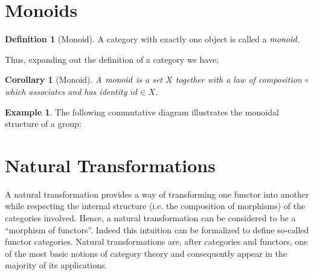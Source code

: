 \documentclass[10pt, oneside, reqno]{amsart}
\theoremstyle{plain}%
\newtheorem*{cor}{Corollary}
\theoremstyle{definition}
\newtheorem{defn}[thm]{Definition}
\newtheorem{exmp}[thm]{Example}
\theoremstyle{remark}
\newcommand{\Id}{\mathit{id}_}
\begin{document}
\section{Monoids} %
\label{sec:monoids}

\begin{defn}[Monoid]
 A category with exactly one object is called a $\emph{monoid}$.
\end{defn}

Thus, expanding out the definition of a category we have;
\begin{cor}[Monoid]
 A $\emph{monoid}$ is a set $X$ together with a law of composition $\circ$
 which associates and has identity $\Id{} \in X$.
\end{cor}

\begin{exmp}
 The following commutative diagram illustrates the monoidal structure of a group:
 \monoid{
  (A\otimes A)\otimes A\otimes A &
  A\otimes (A\otimes A) &
  A\otimes A &
  A\otimes A &
  A &
  \mu\otimes \Id{} &
  \Id{} \otimes\mu &
  \mu &
  \mu\otimes \Id{}
 }
\end{exmp}


\section{Natural Transformations} %
\label{sec:natural transformations}
A natural transformation provides a way of transforming one functor into another
while respecting the internal structure (i.e. the composition of morphisms) of the categories involved.
Hence, a natural transformation can be considered to be a ``morphism of functors''.
Indeed this intuition can be formalized to define so-called functor categories.
Natural transformations are, after categories and functors, one of the most basic notions of category theory and consequently
appear in the majority of its applications.
\end{document}
